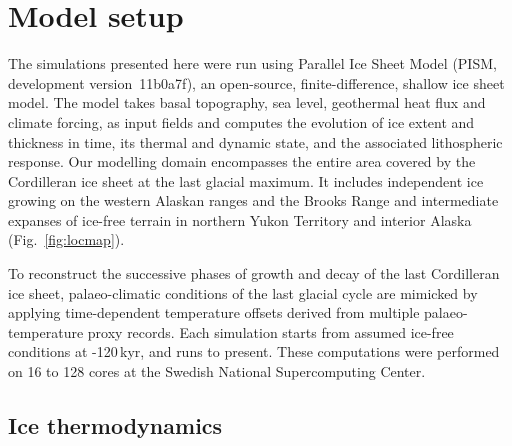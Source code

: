 \section{Model setup}
\label{sec:model}


The simulations presented here were run using Parallel Ice Sheet Model (PISM,
development version~11b0a7f), an open-source, finite-difference, shallow ice
sheet model. The model takes basal topography, sea level, geothermal heat flux
and climate forcing, as input fields and computes the evolution of ice extent
and thickness in time, its thermal and dynamic state, and
the associated lithospheric response. Our modelling domain encompasses the
entire area covered by the Cordilleran ice sheet at the last glacial maximum.
It includes independent ice growing on the western Alaskan ranges and the
Brooks Range and intermediate expanses of ice-free terrain in northern Yukon
Territory and interior Alaska (Fig.~\ref{fig:locmap}).

To reconstruct the successive phases of growth and decay of the last Cordilleran
ice sheet, palaeo-climatic conditions of the last glacial cycle are mimicked
by applying time-dependent temperature offsets derived from multiple
palaeo-temperature proxy records. Each simulation starts from assumed ice-free
conditions at -120\,kyr, and runs to present. These computations were
performed on 16 to 128 cores at the Swedish National Supercomputing
Center.

\subsection{Ice thermodynamics}

